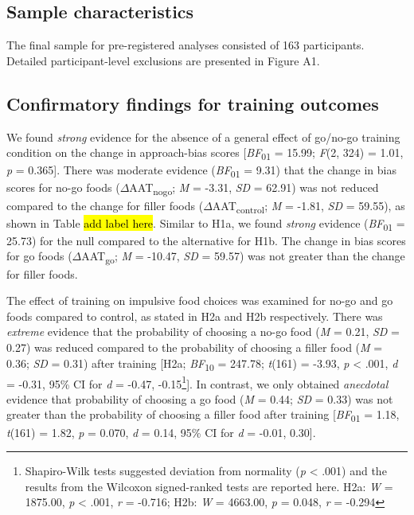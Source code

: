 \documentclass[man,floatsintext]{apa6}
\let\rmarkdownfootnote\footnote%
\def\footnote{\protect\rmarkdownfootnote}
\begin{document}
\hypertarget{sample-characteristics}{%
\subsection{Sample characteristics}\label{sample-characteristics}}

The final sample for pre-registered analyses consisted of 163 participants. Detailed participant-level exclusions are presented in Figure A1.

\hypertarget{confirmatory-findings-for-training-outcomes}{%
\subsection{Confirmatory findings for training outcomes}\label{confirmatory-findings-for-training-outcomes}}

\par

We found \emph{strong} evidence for the absence of a general effect of go/no-go training condition on the change in approach-bias scores {[}\emph{BF}\textsubscript{01} = 15.99; \emph{F}(2, 324) = 1.01, \emph{p} = 0.365{]}. There was moderate evidence (\emph{BF}\textsubscript{01} = 9.31) that the change in bias scores for no-go foods (\(\Delta\)AAT\textsubscript{nogo}; \emph{M} = -3.31, \emph{SD} = 62.91) was not reduced compared to the change for filler foods (\(\Delta\)AAT\textsubscript{control}; \emph{M} = -1.81, \emph{SD} = 59.55), as shown in Table \hl{add label here}. Similar to H1a, we found \emph{strong} evidence (\emph{BF}\textsubscript{01} = 25.73) for the null compared to the alternative for H1b. The change in bias scores for go foods (\(\Delta\)AAT\textsubscript{go}; \emph{M} = -10.47, \emph{SD} = 59.57) was not greater than the change for filler foods.

\par

The effect of training on impulsive food choices was examined for no-go and go foods compared to control, as stated in H2a and H2b respectively. There was \emph{extreme} evidence that the probability of choosing a no-go food (\emph{M} = 0.21, \emph{SD} = 0.27) was reduced compared to the probability of choosing a filler food (\emph{M} = 0.36; \emph{SD} = 0.31) after training {[}H2a; \emph{BF}\textsubscript{10} = 247.78; \emph{t}(161) = -3.93, \emph{p} \textless{} .001, \emph{d} = -0.31, 95\% CI for \emph{d} = -0.47, -0.15\footnote{Shapiro-Wilk tests suggested deviation from normality (\textit{p} < .001) and the results from the Wilcoxon signed-ranked tests are reported here. H2a: \textit{W} = 1875.00, \textit{p} < .001, \textit{r} = -0.716; H2b: \textit{W} = 4663.00, \textit{p} = 0.048, \textit{r} = -0.294}{]}. In contrast, we only obtained \emph{anecdotal} evidence that probability of choosing a go food (\emph{M} = 0.44; \emph{SD} = 0.33) was not greater than the probability of choosing a filler food after training {[}\emph{BF}\textsubscript{01} = 1.18, \emph{t}(161) = 1.82, \emph{p} = 0.070, \emph{d} = 0.14, 95\% CI for \emph{d} = -0.01, 0.30{]}.
\end{document}
